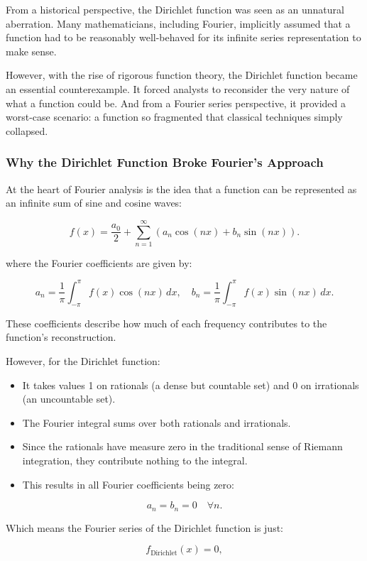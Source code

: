 \documentclass{article}
\begin{document}
From a historical perspective, the Dirichlet function was seen as an unnatural aberration. Many mathematicians, including Fourier, implicitly assumed that a function had to be reasonably well-behaved for its infinite series representation to make sense.

However, with the rise of rigorous function theory, the Dirichlet function became an essential counterexample. It forced analysts to reconsider the very nature of what a function could be. And from a Fourier series perspective, it provided a worst-case scenario: a function so fragmented that classical techniques simply collapsed.

\subsubsection{Why the Dirichlet Function Broke Fourier's Approach}

At the heart of Fourier analysis is the idea that a function can be represented as an infinite sum of sine and cosine waves:

\[
f(x) = \frac{a_0}{2} + \sum_{n=1}^{\infty} \left( a_n \cos(nx) + b_n \sin(nx) \right).
\]

where the Fourier coefficients are given by:

\[
a_n = \frac{1}{\pi} \int_{-\pi}^{\pi} f(x) \cos(n x) \,dx, \quad
b_n = \frac{1}{\pi} \int_{-\pi}^{\pi} f(x) \sin(n x) \,dx.
\]

These coefficients describe how much of each frequency contributes to the function’s reconstruction.

However, for the Dirichlet function:

\begin{itemize}
    \item It takes values 1 on rationals (a dense but countable set) and 0 on irrationals (an uncountable set).
    \item The Fourier integral sums over both rationals and irrationals.
    \item Since the rationals have measure zero in the traditional sense of Riemann integration, they contribute nothing to the integral.
    \item This results in all Fourier coefficients being zero:
\end{itemize}

\[
a_n = b_n = 0 \quad \forall n.
\]

Which means the Fourier series of the Dirichlet function is just:

\[
f_{\text{Dirichlet}}(x) = 0,
\]
\end{document}
